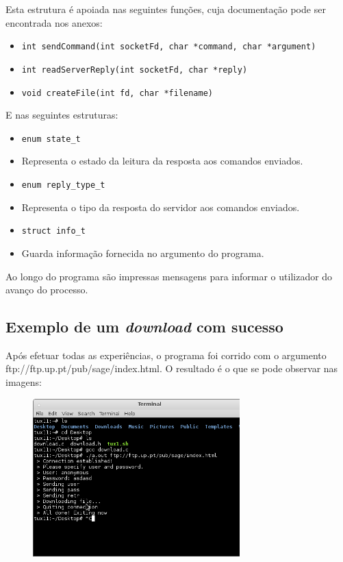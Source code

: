 \documentclass{article}
\begin{document}
Esta estrutura é apoiada nas seguintes funções, cuja documentação pode ser encontrada nos anexos:
\begin{itemize}
\item \texttt{int sendCommand(int socketFd, char *command, char *argument)}
\item \texttt{int readServerReply(int socketFd, char *reply)}
\item \texttt{void createFile(int fd, char *filename)}
\end{itemize}

E nas seguintes estruturas:

\begin{itemize}
\item \texttt{enum state_t}
\item[] Representa o estado da leitura da resposta aos comandos enviados.
\item \texttt{enum reply_type_t}
\item[] Representa o tipo da resposta do servidor aos comandos enviados. 
\item \texttt{struct info_t}
\item[] Guarda informação fornecida no argumento do programa. 
\end{itemize}


Ao longo do programa são impressas mensagens para informar o utilizador do avanço do processo.
\subsection{Exemplo de um \textit{download} com sucesso}
Após efetuar todas as experiências, o programa foi corrido com o argumento
ftp://ftp.up.pt/pub/sage/index.html.
O resultado é o que se pode observar nas imagens:
\begin{figure}[t]
\includegraphics[width=8cm]{images/screen_dl.png}
\end{figure}
\end{document}
